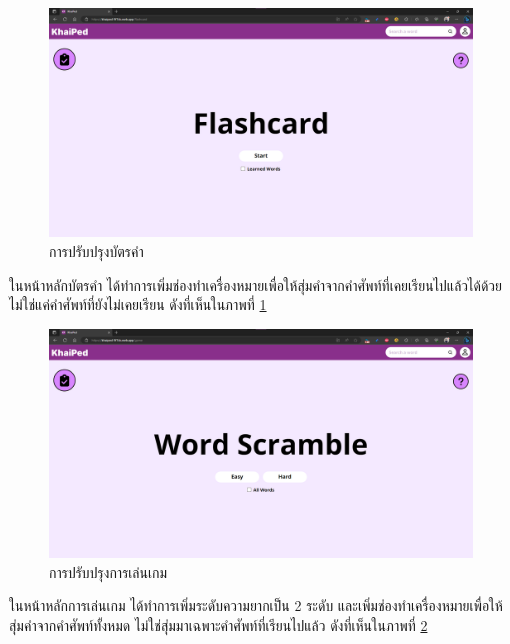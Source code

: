 \documentclass[12pt,oneside,openright,a4paper]{cpe-thai-project}
\begin{document}
\begin{figure}[!h]\centering
	\includegraphics[width=\textwidth, keepaspectratio=true]{image/chap4/Final/flash.png}
	\caption{{การปรับปรุงบัตรคำ}}\label{fig:chap4FinFlash}
\end{figure}
\hspace{1cm}
ในหน้าหลักบัตรคำ ได้ทำการเพิ่มช่องทำเครื่องหมายเพื่อให้สุ่มคำจากคำศัพท์ที่เคยเรียนไปแล้วได้ด้วย ไม่ใช่แค่คำศัพท์ที่ยังไม่เคยเรียน
ดังที่เห็นในภาพที่ \ref{fig:chap4FinFlash}

\pagebreak
\begin{figure}[!h]\centering
	\includegraphics[width=\textwidth, keepaspectratio=true]{image/chap4/Final/game.png}
	\caption{{การปรับปรุงการเล่นเกม}}\label{fig:chap4FinGame}
\end{figure}
\hspace{1cm}
ในหน้าหลักการเล่นเกม ได้ทำการเพิ่มระดับความยากเป็น 2 ระดับ และเพิ่มช่องทำเครื่องหมายเพื่อให้สุ่มคำจากคำศัพท์ทั้งหมด
ไม่ใช่สุ่มมาเฉพาะคำศัพท์ที่เรียนไปแล้ว ดังที่เห็นในภาพที่ \ref{fig:chap4FinGame}
\end{document}
